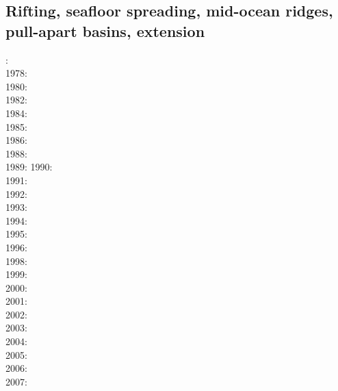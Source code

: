 \subsection{Rifting, seafloor spreading, mid-ocean ridges, pull-apart basins, extension}

{\scriptsize
{}: \cite{froi73}\\
1978: \cite{stei78}\\
1980: \cite{bran80}\\
1982: \cite{bekb82}\\
1984: \cite{poay84}\\
1985: \cite{bosw85}\\
1986: \cite{hoen86b}\cite{zupf86}\cite{zupa86}\cite{mofr86}\\
1988: \cite{bums88}\\
1989: \cite{mewi89}\cite{brbe89}\cite{ismb89}\cite{soen89}\cite{brbe89b}\cite{brbe89c}
1990: \cite{fara90}\cite{lipa90}\cite{mccl90}\\
1991: \cite{trbr91}\cite{buck91}\\
1992: \cite{zieg92b}\cite{egan92}\\
1993: \cite{gowo93}\\
1994: \cite{trca94}\cite{jhpp94}\\
1995: \cite{gowo95}\cite{katl95}\\
1996: \cite{dusa96}\cite{beda96}\cite{mada96}\\
1998: \cite{rafm98}\\
1999: \cite{brun99}\cite{bulp99}\cite{gowo99}\\
2000: \cite{scth00}\\
2001: \cite{hupc01}\cite{hupc01b}\cite{frbr01}\cite{frnb01a}\cite{frnb01b}\\
2002: \cite{hube02}\cite{hani02}\cite{dabm02}\cite{vacl02}\cite{belz02}\cite{hupc02}
      \cite{hube02b}\\
2003: \cite{hube03}\cite{hani03}\cite{covb03}\cite{wibm03}\\
2004: \cite{hier04}\cite{sees04}\\
2005: \cite{hubb05}\cite{coub05}\cite{vanw05}\cite{vabl05}\\
2006: \cite{tibs06}\cite{coma06}\cite{crwy06}\cite{peso06}\\
2007: \cite{huha07}\cite{macl07}\cite{vabl07}\cite{dyrm07}\cite{hube07}\cite{buto07}\cite{socb07}
}
